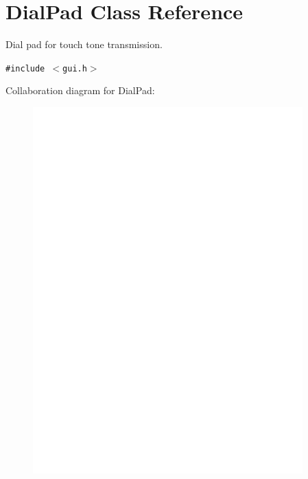 \hypertarget{classDialPad}{
\section{DialPad Class Reference}
\label{classDialPad}
}
Dial pad for touch tone transmission.  


{\tt \#include $<$gui.h$>$}

Collaboration diagram for DialPad:\nopagebreak
\begin{figure}[H]
\begin{center}
\leavevmode
\includegraphics[height=400pt]{classDialPad__coll__graph}
\end{center}
\end{figure}
